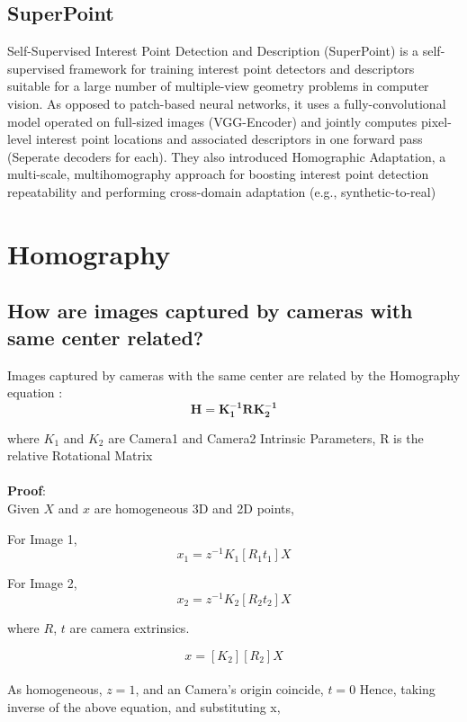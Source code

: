 \documentclass{article}[11pt]
\begin{document}
\subsection{SuperPoint}
Self-Supervised Interest Point Detection and Description (SuperPoint) is a self-supervised framework for
training interest point detectors and descriptors suitable
for a large number of multiple-view geometry problems in
computer vision. As opposed to patch-based neural networks,  it uses a fully-convolutional model operated on full-sized
images (VGG-Encoder) and jointly computes pixel-level interest point locations and associated descriptors in one forward pass (Seperate decoders for each). They also
introduced Homographic Adaptation, a multi-scale, multihomography approach for boosting interest point detection repeatability and performing cross-domain adaptation (e.g., synthetic-to-real)


\section{Homography}

\subsection{How are images captured by cameras with same center related?}
 Images captured by cameras with the same center are related by the Homography equation :
 \begin{equation}
   \mathbf{ H = K_1^{-1}RK_2^{-1}}
\end{equation}

    where  $K_1$ and $K_2$ are Camera1 and Camera2 Intrinsic Parameters,
    R is the relative Rotational Matrix
\\
\\
\textbf{Proof}:
\\
Given $X$ and $x$ are homogeneous 3D and 2D points,

For Image 1,
\begin{equation}
    x_1 = z^{-1}K_1[R_1 t_1]X 
\end{equation}

For Image 2,
\begin{equation}
    x_2 = z^{-1}K_2[R_2 t_2]X 
\end{equation}

where $R$, $t$ are camera extrinsics.

\begin{equation}
    x=[K_2][R_2]X 
\end{equation}
\\    As homogeneous, $z=1$, and an Camera's origin coincide, $t=0$
    Hence, taking inverse of the above equation, and substituting x,
    
\end{document}
